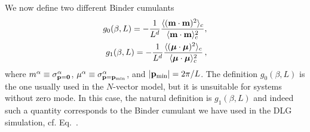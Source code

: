 \documentclass[12pt]{article}
\begin{document}
We now define two different Binder cumulants
\begin{eqnarray}
g_0(\beta,L) = - \frac{1}{L^d}
\frac{\langle({\bf m}\cdot{\bf m})^2\rangle_c}{
      \langle{\bf m}\cdot{\bf m}\rangle^2_c}, \nonumber \\
g_1(\beta,L) = - \frac{1}{L^d}
\frac{\langle(\mbox{\protect\boldmath $\mu$}\cdot\mbox{\protect\boldmath $\mu$})^2\rangle_c}{\langle\mbox{\protect\boldmath $\mu$}\cdot\mbox{\protect\boldmath $\mu$}\rangle^2_c} \, ,
\end{eqnarray}
where 
$m^\alpha\equiv\sigma^\alpha_{{\bf p}={\bf 0}}$,
$\mu^\alpha\equiv\sigma^\alpha_{{\bf p}={\bf p}_{\rm min}}$, 
and $|{\bf p}_{\rm min}| = 2\pi/L$. The definition $g_0(\beta,L)$ is the 
one usually used in the $N$-vector model, but it is unsuitable
for systems without zero mode. In this case, the natural definition is 
$g_1(\beta,L)$ and indeed such a quantity corresponds to the 
Binder cumulant we have used in the DLG simulation, cf. Eq.~.
\end{document}
